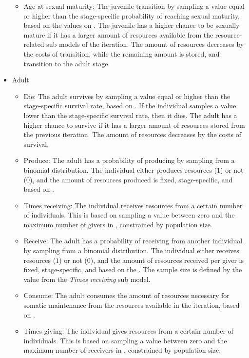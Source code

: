 \documentclass{article}
\begin{document}
\begin{itemize}
\begin{itemize}
        \item Age at sexual maturity: The juvenile transition by sampling a value equal or higher than the stage-specific probability of reaching sexual maturity, based on the values on \citep{ellison2017reproductive}. The juvenile has a higher chance to be sexually mature if it has a larger amount of resources available from the resource-related sub models of the iteration. The amount of resources decreases by the costs of transition, while the remaining amount is stored, and transition to the adult stage.
    \end{itemize}
    \item Adult
    \begin{itemize}
        \item Die: The adult survives by sampling a value equal or higher than the stage-specific survival rate, based on \cite{gurven2007longevity}. If the individual samples a value lower than the stage-specific survival rate, then it dies. The adult has a higher chance to survive if it has a larger amount of resources stored from the previous iteration. The amount of resources decreases by the costs of survival.
        \item Produce: The adult has a probability of producing by sampling from a binomial distribution. The individual either produces resources ($1$) or not ($0$), and the amount of resources produced is fixed, stage-specific, and based on \cite{koster2020life}.
        \item Times receiving: The individual receives resources from a certain number of individuals. This is based on sampling a value between zero and the maximum number of givers in \cite{gurven2004give}, constrained by population size.
        \item Receive: The adult has a probability of receiving from another individual by sampling from a binomial distribution. The individual either receives resources ($1$) or not ($0$), and the amount of resources received per giver is fixed, stage-specific, and based on the \cite{gurven2004give}. The sample size is defined by the value from the \emph{Times receiving} sub model. 
        \item Consume: The adult consumes the amount of resources necessary for somatic maintenance from the resources available in the iteration, based on \cite{kaplan2000theory,pontzer2021daily}.
        \item Times giving: The individual gives resources from a certain number of individuals. This is based on sampling a value between zero and the maximum number of receivers in \cite{gurven2004give}, constrained by population size.

\end{itemize}
\end{itemize}
\end{document}
